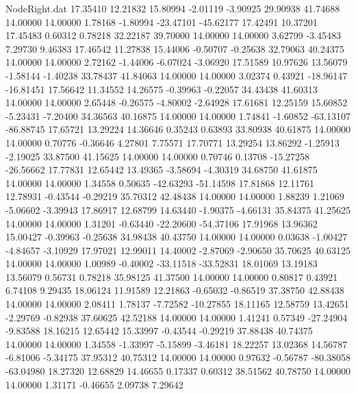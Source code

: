 \begin{filecontents}{NodeRight.dat}
  17.35410   12.21832   15.80994    -2.01119   -3.90925   29.90938   41.74688   14.00000   14.00000    1.78168   -1.80994  -23.47101  -45.62177
  17.42491   10.37201   17.45483     0.60312    0.78218   32.22187   39.70000   14.00000   14.00000    3.62799   -3.45483    7.29730    9.46383
  17.46542   11.27838   15.44006    -0.50707   -0.25638   32.79063   40.24375   14.00000   14.00000    2.72162   -1.44006   -6.07024   -3.06920
  17.51589   10.97626   13.56079    -1.58144   -1.40238   33.78437   41.84063   14.00000   14.00000    3.02374    0.43921  -18.96147  -16.81451
  17.56642   11.34552   14.26575    -0.39963   -0.22057   34.43438   41.60313   14.00000   14.00000    2.65448   -0.26575   -4.80002   -2.64928
  17.61681   12.25159   15.60852    -5.23431   -7.20400   34.36563   40.16875   14.00000   14.00000    1.74841   -1.60852  -63.13107  -86.88745
  17.65721   13.29224   14.36646     0.35243    0.63893   33.80938   40.61875   14.00000   14.00000    0.70776   -0.36646    4.27801    7.75571
  17.70771   13.29254   13.86292    -1.25913   -2.19025   33.87500   41.15625   14.00000   14.00000    0.70746    0.13708  -15.27258  -26.56662
  17.77831   12.65442   13.49365    -3.58694   -4.30319   34.68750   41.61875   14.00000   14.00000    1.34558    0.50635  -42.63293  -51.14598
  17.81868   12.11761   12.78931    -0.43544   -0.29219   35.70312   42.48438   14.00000   14.00000    1.88239    1.21069   -5.06602   -3.39943
  17.86917   12.68799   14.63440    -1.90375   -4.66131   35.84375   41.25625   14.00000   14.00000    1.31201   -0.63440  -22.20600  -54.37106
  17.91968   13.96362   15.00427    -0.39963   -0.25638   34.98438   40.43750   14.00000   14.00000    0.03638   -1.00427   -4.84657   -3.10929
  17.97021   12.99011   14.40002    -2.87069   -2.90650   35.70625   40.63125   14.00000   14.00000    1.00989   -0.40002  -33.11518  -33.52831
  18.01069   13.19183   13.56079     0.56731    0.78218   35.98125   41.37500   14.00000   14.00000    0.80817    0.43921    6.74108    9.29435
  18.06124   11.91589   12.21863    -0.65032   -0.86519   37.38750   42.88438   14.00000   14.00000    2.08411    1.78137   -7.72582  -10.27855
  18.11165   12.58759   13.42651    -2.29769   -0.82938   37.60625   42.52188   14.00000   14.00000    1.41241    0.57349  -27.24904   -9.83588
  18.16215   12.65442   15.33997    -0.43544   -0.29219   37.88438   40.74375   14.00000   14.00000    1.34558   -1.33997   -5.15899   -3.46181
  18.22257   13.02368   14.56787    -6.81006   -5.34175   37.95312   40.75312   14.00000   14.00000    0.97632   -0.56787  -80.38058  -63.04980
  18.27320   12.68829   14.46655     0.17337    0.60312   38.51562   40.78750   14.00000   14.00000    1.31171   -0.46655    2.09738    7.29642

\end{filecontents}
